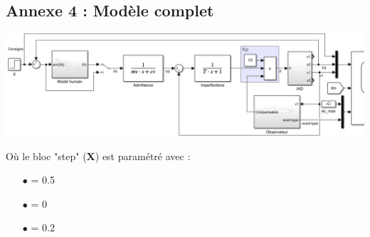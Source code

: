 \documentclass[a4paper,12pt]{article}
\begin{document}
    \subsection{Annexe 4 : Modèle complet} \label{Annexe:modelComplet}
    \begin{center}
        \includegraphics[width=24cm, angle=-90]{./img/model_complet.png}
    \end{center}
    Où le bloc "step" (\textbf{X}) est paramétré avec : 
    \begin{itemize}
        \item[$\bullet$]  = 0.5
        \item[$\bullet$]  = 0
        \item[$\bullet$]  = 0.2
    \end{itemize}
\end{document}
